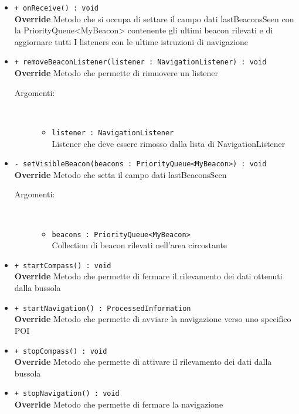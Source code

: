 \documentclass[../DefinizioneDiProdotto.tex]{subfiles}
\begin{document}
\begin{description}
\begin{itemize}
\item \texttt{+ onReceive() : void}\\
\textbf{Override} Metodo che si occupa di settare il campo dati lastBeaconsSeen con la PriorityQueue<MyBeacon> contenente gli ultimi beacon rilevati e di aggiornare tutti I listeners con le ultime istruzioni di navigazione
 \item \texttt{+ removeBeaconListener(listener : NavigationListener) : void}\\
\textbf{Override} Metodo che permette di rimuovere un listener
 \begin{description}
\item[Argomenti:] \
\begin{itemize}
\item \texttt{listener : NavigationListener}\\
Listener che deve essere rimosso dalla lista di NavigationListener\end{itemize}
\end{description}
\item \texttt{- setVisibleBeacon(beacons : PriorityQueue<MyBeacon>) : void}\\
\textbf{Override} Metodo che setta il campo dati lastBeaconsSeen
 \begin{description}
\item[Argomenti:] \
\begin{itemize}
\item \texttt{beacons : PriorityQueue<MyBeacon>}\\
Collection di beacon rilevati nell'area circostante\end{itemize}
\end{description}
\item \texttt{+ startCompass() : void}\\
\textbf{Override} Metodo che permette di fermare il rilevamento dei dati ottenuti dalla bussola
 \item \texttt{+ startNavigation() : ProcessedInformation}\\
\textbf{Override} Metodo che permette di avviare la navigazione verso uno specifico POI
 \item \texttt{+ stopCompass() : void}\\
\textbf{Override} Metodo che permette di attivare il rilevamento dei dati dalla bussola
 \item \texttt{+ stopNavigation() : void}\\
\textbf{Override} Metodo che permette di fermare la navigazione
 \end{itemize}
\end{description}
\end{document}
